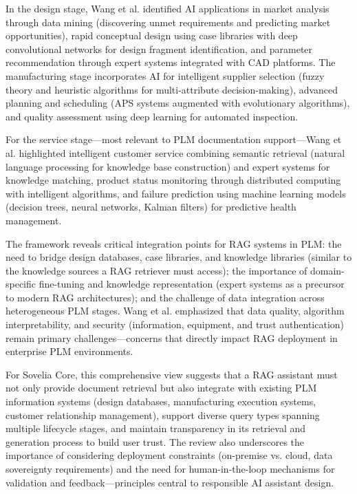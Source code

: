 In the design stage, Wang et al. identified AI applications in market analysis through data mining (discovering unmet requirements and predicting market opportunities), rapid conceptual design using case libraries with deep convolutional networks for design fragment identification, and parameter recommendation through expert systems integrated with CAD platforms. The manufacturing stage incorporates AI for intelligent supplier selection (fuzzy theory and heuristic algorithms for multi-attribute decision-making), advanced planning and scheduling (APS systems augmented with evolutionary algorithms), and quality assessment using deep learning for automated inspection.

For the service stage—most relevant to PLM documentation support—Wang et al. highlighted intelligent customer service combining semantic retrieval (natural language processing for knowledge base construction) and expert systems for knowledge matching, product status monitoring through distributed computing with intelligent algorithms, and failure prediction using machine learning models (decision trees, neural networks, Kalman filters) for predictive health management.

The framework reveals critical integration points for RAG systems in PLM: the need to bridge design databases, case libraries, and knowledge libraries (similar to the knowledge sources a RAG retriever must access); the importance of domain-specific fine-tuning and knowledge representation (expert systems as a precursor to modern RAG architectures); and the challenge of data integration across heterogeneous PLM stages. Wang et al. emphasized that data quality, algorithm interpretability, and security (information, equipment, and trust authentication) remain primary challenges—concerns that directly impact RAG deployment in enterprise PLM environments.

For Sovelia Core, this comprehensive view suggests that a RAG assistant must not only provide document retrieval but also integrate with existing PLM information systems (design databases, manufacturing execution systems, customer relationship management), support diverse query types spanning multiple lifecycle stages, and maintain transparency in its retrieval and generation process to build user trust. The review also underscores the importance of considering deployment constraints (on-premise vs. cloud, data sovereignty requirements) and the need for human-in-the-loop mechanisms for validation and feedback—principles central to responsible AI assistant design.


